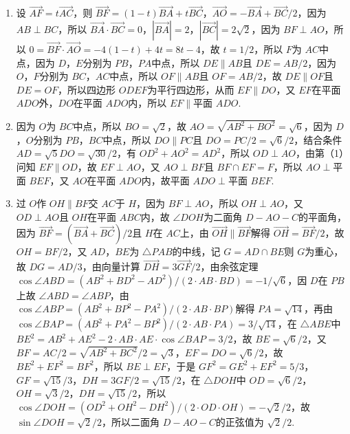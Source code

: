 \begin{solution}
\begin{enumerate}\item 设 \(\overrightarrow{AF}=t\overrightarrow{AC}\)，则 \(\overrightarrow{BF}=\left(1-t\right)\overrightarrow{BA}+t\overrightarrow{BC}\)，\(\overrightarrow{AO}=-\overrightarrow{BA}+\overrightarrow{BC}/2\)，因为 \(AB\perp BC\)，所以 \(\overrightarrow{BA}\cdot\overrightarrow{BC}=0\)，\(\left|\overrightarrow{BA}\right|=2\)，\(\left|\overrightarrow{BC}\right|=2\sqrt{2}\)，因为 \(BF\perp AO\)，所以 \(0=\overrightarrow{BF}\cdot\overrightarrow{AO}=-4\left(1-t\right)+4t=8t-4\)，故 \(t=1/2\)，所以 \(F\)为 \(AC\)中点，因为 \(D\)，\(E\)分别为 \(PB\)，\(PA\)中点，所以 \(DE\parallel AB\)且 \(DE=AB/2\)，因为 \(O\)，\(F\)分别为 \(BC\)，\(AC\)中点，所以 \(OF\parallel AB\)且 \(OF=AB/2\)，故 \(DE\parallel OF\)且 \(DE=OF\)，所以四边形 \(ODEF\)为平行四边形，从而 \(EF\parallel DO\)，又 \(EF\)在平面 \(ADO\)外，\(DO\)在平面 \(ADO\)内，所以 \(EF\parallel\)平面 \(ADO\).\item 因为 \(O\)为 \(BC\)中点，所以 \(BO=\sqrt{2}\)，故 \(AO=\sqrt{AB^{2}+BO^{2}}=\sqrt{6}\)，因为 \(D\)，\(O\)分别为 \(PB\)，\(BC\)中点，所以 \(DO\parallel PC\)且 \(DO=PC/2=\sqrt{6}/2\)，结合条件 \(AD=\sqrt{5}DO=\sqrt{30}/2\)，有 \(OD^{2}+AO^{2}=AD^{2}\)，所以 \(OD\perp AO\)，由第（1）问知 \(EF\parallel OD\)，故 \(EF\perp AO\)，又 \(AO\perp BF\)且 \(BF\cap EF=F\)，所以 \(AO\perp\)平面 \(BEF\)，又 \(AO\)在平面 \(ADO\)内，故平面 \(ADO\perp\)平面 \(BEF\).\item 过 \(O\)作 \(OH\parallel BF\)交 \(AC\)于 \(H\)，因为 \(BF\perp AO\)，所以 \(OH\perp AO\)，又 \(OD\perp AO\)且 \(OH\)在平面 \(ABC\)内，故 \(\angle DOH\)为二面角 \(D-AO-C\)的平面角，因为 \(\overrightarrow{BF}=\left(\overrightarrow{BA}+\overrightarrow{BC}\right)/2\)且 \(H\)在 \(AC\)上，由 \(\overrightarrow{OH}\parallel\overrightarrow{BF}\)解得 \(\overrightarrow{OH}=\overrightarrow{BF}/2\)，故 \(OH=BF/2\)，又 \(AD\)，\(BE\)为 \(\triangle PAB\)的中线，记 \(G=AD\cap BE\)则 \(G\)为重心，故 \(DG=AD/3\)，由向量计算 \(\overrightarrow{DH}=3\overrightarrow{GF}/2\)，由余弦定理 \(\cos\angle ABD=\left(AB^{2}+BD^{2}-AD^{2}\right)/\left(2\cdot AB\cdot BD\right)=-1/\sqrt{6}\)，因 \(D\)在 \(PB\)上故 \(\angle ABD=\angle ABP\)，由 \(\cos\angle ABP=\left(AB^{2}+BP^{2}-PA^{2}\right)/\left(2\cdot AB\cdot BP\right)\)解得 \(PA=\sqrt{14}\)，再由 \(\cos\angle BAP=\left(AB^{2}+PA^{2}-BP^{2}\right)/\left(2\cdot AB\cdot PA\right)=3/\sqrt{14}\)，在 \(\triangle ABE\)中 \(BE^{2}=AB^{2}+AE^{2}-2\cdot AB\cdot AE\cdot\cos\angle BAP=3/2\)，故 \(BE=\sqrt{6}/2\)，又 \(BF=AC/2=\sqrt{AB^{2}+BC^{2}}/2=\sqrt{3}\)，\(EF=DO=\sqrt{6}/2\)，故 \(BE^{2}+EF^{2}=BF^{2}\)，所以 \(BE\perp EF\)，于是 \(GF^{2}=GE^{2}+EF^{2}=5/3\)，\(GF=\sqrt{15}/3\)，\(DH=3GF/2=\sqrt{15}/2\)，在 \(\triangle DOH\)中 \(OD=\sqrt{6}/2\)，\(OH=\sqrt{3}/2\)，\(DH=\sqrt{15}/2\)，所以 \(\cos\angle DOH=\left(OD^{2}+OH^{2}-DH^{2}\right)/\left(2\cdot OD\cdot OH\right)=-\sqrt{2}/2\)，故 \(\sin\angle DOH=\sqrt{2}/2\)，所以二面角 \(D-AO-C\)的正弦值为 \(\sqrt{2}/2\).\end{enumerate}
\end{solution}

